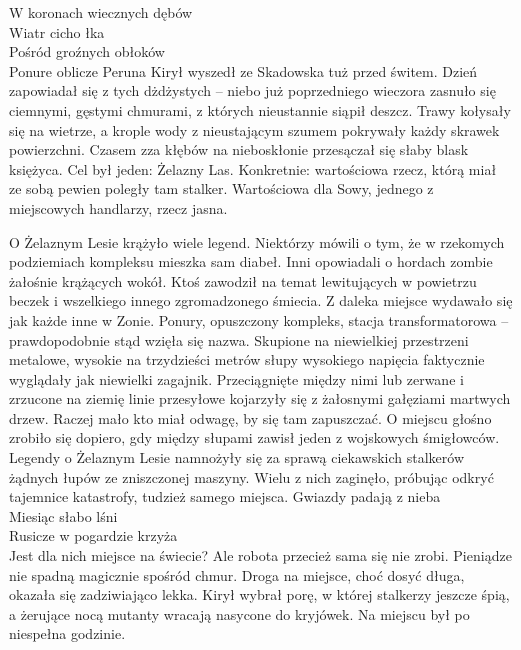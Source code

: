 \documentclass[../MAIN.tex]{subfiles}
\begin{document}
\sw[14em]
W koronach wiecznych dębów\\
Wiatr cicho łka\\
Pośród groźnych obłoków\\
Ponure oblicze Peruna
\qw
Kirył wyszedł ze Skadowska tuż przed świtem. Dzień zapowiadał się z tych dżdżystych – niebo już poprzedniego wieczora zasnuło się ciemnymi, gęstymi chmurami, z których nieustannie siąpił deszcz. Trawy kołysały się na wietrze, a krople wody z nieustającym szumem pokrywały każdy skrawek powierzchni. Czasem zza kłębów na nieboskłonie przesączał się słaby blask księżyca. Cel był jeden: Żelazny Las. Konkretnie: wartościowa rzecz, którą miał ze sobą pewien poległy tam stalker. Wartościowa dla Sowy, jednego z miejscowych handlarzy, rzecz jasna.

O Żelaznym Lesie krążyło wiele legend. Niektórzy mówili o tym, że w rzekomych podziemiach kompleksu mieszka sam diabeł. Inni opowiadali o hordach zombie żałośnie krążących wokół. Ktoś zawodził na temat lewitujących w powietrzu beczek i wszelkiego innego zgromadzonego śmiecia. Z daleka miejsce wydawało się jak każde inne w Zonie. Ponury, opuszczony kompleks, stacja transformatorowa – prawdopodobnie stąd wzięła się nazwa. Skupione na niewielkiej przestrzeni metalowe, wysokie na trzydzieści metrów słupy wysokiego napięcia faktycznie wyglądały jak niewielki zagajnik. Przeciągnięte między nimi lub zerwane i zrzucone na ziemię linie przesyłowe kojarzyły się z żałosnymi gałęziami martwych drzew. Raczej mało kto miał odwagę, by się tam zapuszczać. O miejscu głośno zrobiło się dopiero, gdy między słupami zawisł jeden z wojskowych śmigłowców. Legendy o Żelaznym Lesie namnożyły się za sprawą ciekawskich stalkerów żądnych łupów ze zniszczonej maszyny. Wielu z nich zaginęło, próbując odkryć tajemnice katastrofy, tudzież 
samego miejsca.
\sw[15em]
Gwiazdy padają z nieba\\
Miesiąc słabo lśni\\
Rusicze w pogardzie krzyża\\
Jest dla nich miejsce na świecie?
\qw
Ale robota przecież sama się nie zrobi. Pieniądze nie spadną magicznie spośród chmur. Droga na miejsce, choć dosyć długa, okazała się zadziwiająco lekka. Kirył wybrał porę, w której stalkerzy jeszcze śpią, a żerujące nocą mutanty wracają nasycone do kryjówek. Na miejscu był po niespełna godzinie.
\end{document}

